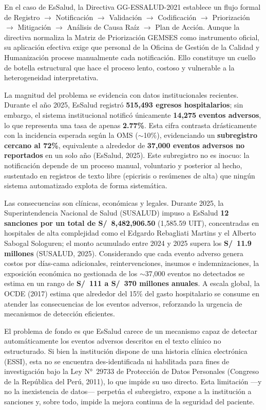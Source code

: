 \documentclass[12pt,a4paper,oneside]{book}
\begin{document}
En el caso de EsSalud, la Directiva GG-ESSALUD-2021 establece un flujo formal de Registro $\rightarrow$ Notificación $\rightarrow$ Validación $\rightarrow$ Codificación $\rightarrow$ Priorización $\rightarrow$ Mitigación $\rightarrow$ Análisis de Causa Raíz $\rightarrow$ Plan de Acción. Aunque la directiva normaliza la Matriz de Priorización GEMSES como instrumento oficial, su aplicación efectiva exige que personal de la Oficina de Gestión de la Calidad y Humanización procese manualmente cada notificación. Ello constituye un cuello de botella estructural que hace el proceso lento, costoso y vulnerable a la heterogeneidad interpretativa.

La magnitud del problema se evidencia con datos institucionales recientes. Durante el año 2025, EsSalud registró \textbf{515{,}493 egresos hospitalarios}; sin embargo, el sistema institucional notificó únicamente \textbf{14{,}275 eventos adversos}, lo que representa una tasa de apenas \textbf{2.77\%}. Esta cifra contrasta drásticamente con la incidencia esperada según la OMS ($\sim$10\%), evidenciando un \textbf{subregistro cercano al 72\%}, equivalente a alrededor de \textbf{37{,}000 eventos adversos no reportados} en un solo año (EsSalud, 2025). Este subregistro no es inocuo: la notificación depende de un proceso manual, voluntario y posterior al hecho, sustentado en registros de texto libre (epicrisis o resúmenes de alta) que ningún sistema automatizado explota de forma sistemática.

Las consecuencias son clínicas, económicas y legales. Durante 2025, la Superintendencia Nacional de Salud (SUSALUD) impuso a EsSalud \textbf{12 sanciones por un total de S/~8{,}482{,}906.50} (1{,}585.59 UIT), concentradas en hospitales de alta complejidad como el Edgardo Rebagliati Martins y el Alberto Sabogal Sologuren; el monto acumulado entre 2024 y 2025 supera los \textbf{S/~11.9 millones} (SUSALUD, 2025). Considerando que cada evento adverso genera costos por días-cama adicionales, reintervenciones, insumos e indemnizaciones, la exposición económica no gestionada de los $\sim$37{,}000 eventos no detectados se estima en un rango de \textbf{S/~111 a S/~370 millones anuales}. A escala global, la OCDE (2017) estima que alrededor del 15\% del gasto hospitalario se consume en atender las consecuencias de los eventos adversos, reforzando la urgencia de mecanismos de detección eficientes.

El problema de fondo es que EsSalud carece de un mecanismo capaz de detectar automáticamente los eventos adversos descritos en el texto clínico no estructurado. Si bien la institución dispone de una historia clínica electrónica (ESSI), esta no se encuentra des-identificada ni habilitada para fines de investigación bajo la Ley N°~29733 de Protección de Datos Personales (Congreso de la República del Perú, 2011), lo que impide su uso directo. Esta limitación ---y no la inexistencia de datos--- perpetúa el subregistro, expone a la institución a sanciones y, sobre todo, impide la mejora continua de la seguridad del paciente.
\end{document}

